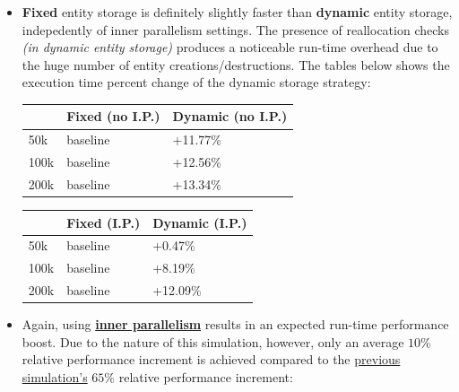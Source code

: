 \documentclass[oneside, 12pt, a4paper, openany]{book}
\begin{document}
\begin{itemize}
\item
  \textbf{Fixed} entity storage is definitely slightly faster than
  \textbf{dynamic} entity storage, indepedently of inner parallelism
  settings. The presence of reallocation checks \emph{(in dynamic entity
  storage)} produces a noticeable run-time overhead due to the huge
  number of entity creations/destructions. The tables below shows the
  execution time percent change of the dynamic storage strategy:

  \begin{longtable}[]{@{}lll@{}}
  \toprule
  \begin{minipage}[b]{0.32\columnwidth}\raggedright\strut
  \strut
  \end{minipage} &
  \begin{minipage}[b]{0.32\columnwidth}\raggedright\strut
  Fixed (no I.P.)\strut
  \end{minipage} &
  \begin{minipage}[b]{0.32\columnwidth}\raggedright\strut
  Dynamic (no I.P.)\strut
  \end{minipage}\tabularnewline
  \midrule
  \endhead
  50k & baseline & +11.77\%\tabularnewline
  100k & baseline & +12.56\%\tabularnewline
  200k & baseline & +13.34\%\tabularnewline
  \bottomrule
  \end{longtable}

  \begin{longtable}[]{@{}lll@{}}
  \toprule
  \begin{minipage}[b]{0.32\columnwidth}\raggedright\strut
  \strut
  \end{minipage} &
  \begin{minipage}[b]{0.32\columnwidth}\raggedright\strut
  Fixed (I.P.)\strut
  \end{minipage} &
  \begin{minipage}[b]{0.32\columnwidth}\raggedright\strut
  Dynamic (I.P.)\strut
  \end{minipage}\tabularnewline
  \midrule
  \endhead
  50k & baseline & +0.47\%\tabularnewline
  100k & baseline & +8.19\%\tabularnewline
  200k & baseline & +12.09\%\tabularnewline
  \bottomrule
  \end{longtable}
\item
  Again, using
  \protect\hyperlink{multithreading_inner_par}{\textbf{inner
  parallelism}} results in an expected run-time performance boost. Due
  to the nature of this simulation, however, only an average \(10\)\%
  relative performance increment is achieved compared to the
  \protect\hyperlink{bench_parsim_conc}{previous simulation's} \(65\)\%
  relative performance increment:


\end{itemize}
\end{document}
